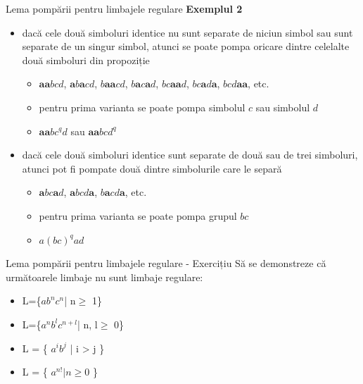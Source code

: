 \documentclass[pdf]{beamer}
\begin{document}
\begin{frame}{Lema pompării pentru limbajele regulare}
\textbf{Exemplul 2}
\begin{itemize}
\item
dacă cele două simboluri identice nu sunt separate de niciun simbol sau sunt separate de un singur simbol, atunci se poate pompa oricare dintre celelalte două simboluri din propoziție

\begin{itemize}
\item
$\textbf{aa}bcd$, $\textbf{a}b\textbf{a}cd$, $b\textbf{aa}cd$, $b\textbf{a}c\textbf{a}d$, $bc\textbf{aa}d$, $bc\textbf{a}d\textbf{a}$, $bcd\textbf{aa}$, etc.
\item
pentru prima varianta se poate pompa simbolul $c$ sau simbolul $d$
\item
$\textbf{aa}bc^q d$ sau $\textbf{aa}bcd^q$
\end{itemize}
\item
dacă cele două simboluri identice sunt separate de două sau de trei simboluri, atunci pot fi pompate două dintre simbolurile care le separă
\begin{itemize}
\item
$\textbf{a}bc\textbf{a}d$, $\textbf{a}bcd\textbf{a}$, $b\textbf{a}cd\textbf{a}$, etc.
\item
pentru prima varianta se poate pompa grupul $bc$
\item
$a(bc)^q ad$
\end{itemize}
\end{itemize}
\end{frame}



\begin{frame}{Lema pompării pentru limbajele regulare - Exercițiu}
Să se demonstreze că următoarele limbaje nu sunt limbaje regulare:

\begin{itemize}
\item
L=\{$a b^n c^n$| n$\geq$ 1\}
\newline

\item
L=\{$a^n b^l c^{n+l}$| n, l$\geq$ 0\}
\newline

\item
L = \{ $a^i b^j$ | i > j \}
\newline

\item
L = \{ $a^{n!} | n \geq 0$ \}
\newline

\end{itemize}
\end{frame}
\end{document}
